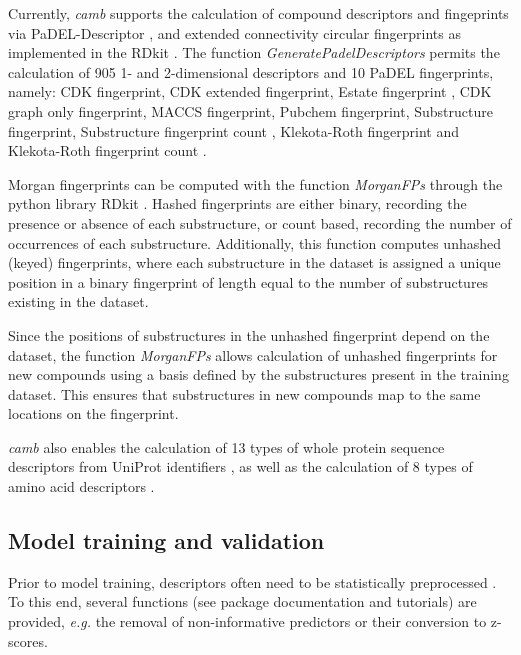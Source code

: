 \documentclass{bioinfo}
\begin{document}
Currently, {\it camb} supports the calculation of compound descriptors and fingeprints via PaDEL-Descriptor \citep{padel},
and extended connectivity circular fingerprints \citep{extended_fp} as implemented in the RDkit \citep{rdkit}.
The function {\it GeneratePadelDescriptors} permits the calculation of 905 1- and 2-dimensional descriptors and 10 PaDEL fingerprints, namely: %
CDK fingerprint, CDK extended fingerprint, Estate fingerprint \cite{state_fp}, CDK graph only fingerprint, MACCS fingerprint,
Pubchem fingerprint, Substructure fingerprint, Substructure fingerprint count \citep{obabel}, Klekota-Roth fingerprint and Klekota-Roth fingerprint count \citep{privileged_substructures}.

Morgan fingerprints can be computed with the function {\it MorganFPs}
through the python library RDkit \citep{rdkit}.
Hashed fingerprints are either binary, recording the presence or absence of each substructure,
 or count based, recording the number of occurrences of each substructure.
Additionally, this function computes unhashed (keyed) fingerprints, 
where each substructure in the dataset is assigned a unique position in a binary fingerprint of length equal to the number of substructures existing in the dataset.

Since the positions of substructures in the unhashed fingerprint depend on the dataset, the function {\it MorganFPs} allows calculation of unhashed fingerprints for new compounds using a basis defined by the substructures present in the training dataset. This ensures that substructures in new compounds map to the same locations on the fingerprint.

{\it camb} also enables the calculation of 13 types of whole protein sequence descriptors
from UniProt identifiers \citep{protr},
as well as the calculation of 8 types of amino acid descriptors \citep{AA_benchmark}.

\subsection{Model training and validation}

Prior to model training, descriptors often need to be statistically preprocessed \citep{andersson}.
To this end, several functions (see package documentation and tutorials)
are provided, {\it e.g.} the removal of non-informative predictors or
their conversion to z-scores.
\end{document}
